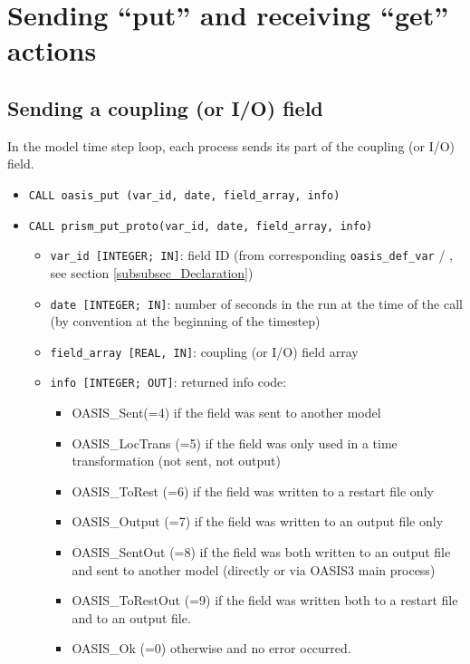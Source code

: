 
\section{Sending ``put'' and receiving ``get'' actions}
\label{subsubsec_sendingreceiving}

\subsection{Sending a coupling (or I/O) field}
\label{prismput}

In the model time step loop, each process 
sends its part of the coupling (or I/O) field. 

\begin{itemize} 
\item {\tt CALL oasis\_put       (var\_id, date, field\_array, info)}
\item {\tt CALL prism\_put\_proto(var\_id, date, field\_array, info)}
\begin{itemize}
\item {\tt var\_id [INTEGER; IN]}: field ID (from
  corresponding {\tt oasis\_def\_var} / ,
  see section \ref{subsubsec_Declaration})
\item {\tt date [INTEGER; IN]}: number of seconds in the run at the
time of the call (by convention at the beginning of the timestep)
\item {\tt field\_array [REAL, IN]}: coupling (or I/O) field array 
\item {\tt info [INTEGER; OUT]}: returned info code:
   \begin{itemize} 
      \item OASIS\_Sent(=4) if the field was sent to another model 
      \item OASIS\_LocTrans (=5) if the field was only used in a time
       transformation (not sent, not output)
      \item OASIS\_ToRest (=6) if the field was written to a restart file only
      \item OASIS\_Output (=7) if the field was written to an output file only
      \item OASIS\_SentOut (=8) if the field was both written to an output file
       and sent to another model (directly or via OASIS3 main process)
      \item OASIS\_ToRestOut (=9) if the field was written both to a
       restart file and to an output file.
      \item OASIS\_Ok (=0) otherwise and no error occurred.
   \end{itemize}
\end{itemize}
\end{itemize}


